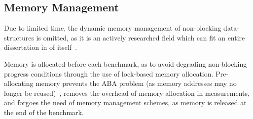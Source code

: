 \subsection{Memory Management}
Due to limited time, the dynamic memory management of non-blocking
data-structures is omitted, as it is an actively researched field which can fit
an entire dissertation in of itself~\citep{valois1995datastructures,michael2004hazard}.

Memory is allocated before each benchmark, as to avoid degrading
non-blocking progress conditions through the use of lock-based memory
allocation. Pre-allocating memory prevents the ABA problem (as memory addresses
may no longer be reused)~\citep{dechev2010understanding}, removes the overhead
of memory allocation in measurements, and forgoes the need of memory management
schemes, as memory is released at the end of the benchmark.

